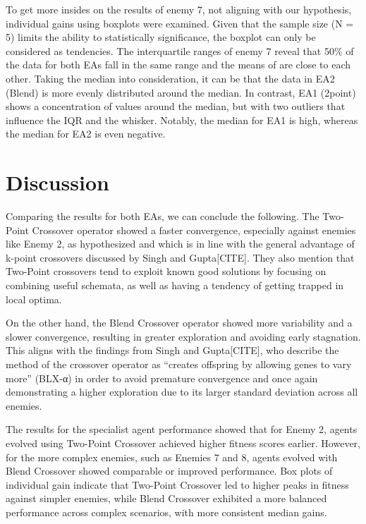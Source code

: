 To get more insides on the results of enemy 7, not aligning with our hypothesis, individual gains using boxplots were examined.
Given that the sample size (N = 5) limits the ability to statistically significance, the boxplot can only be considered as tendencies.
The interquartile ranges of enemy 7 reveal that 50\% of the data for both EAs fall in the same range and the means of are close to each other.
Taking the median into consideration, it can be that the data in EA2 (Blend) is more evenly distributed around the median.
In contrast, EA1 (2point) shows a concentration of values around the median, but with two outliers that influence the IQR and the whisker.
Notably, the median for EA1 is high, whereas the median for EA2 is even negative.


\section{Discussion}
Comparing the results for both EAs, we can conclude the following.
The Two-Point Crossover operator showed a faster convergence, especially against enemies like Enemy 2, as hypothesized and which is in line with the general advantage of k-point crossovers discussed by Singh and Gupta[CITE].
They also mention that Two-Point crossovers tend to exploit known good solutions by focusing on combining useful schemata, as well as having a tendency of getting trapped in local optima.

On the other hand, the Blend Crossover operator showed more variability and a slower convergence, resulting in greater exploration and avoiding early stagnation.
This aligns with the findings from Singh and Gupta[CITE], who describe the method of the crossover operator as “creates offspring by allowing genes to vary more” (BLX-α) in order to avoid premature convergence and once again demonstrating a higher exploration due to its larger standard deviation across all enemies.

The results for the specialist agent performance showed that for Enemy 2, agents evolved using Two-Point Crossover achieved higher fitness scores earlier.
However, for the more complex enemies, such as Enemies 7 and 8, agents evolved with Blend Crossover showed comparable or improved performance.
Box plots of individual gain indicate that Two-Point Crossover led to higher peaks in fitness against simpler enemies, while Blend Crossover exhibited a more balanced performance across complex scenarios, with more consistent median gains.



